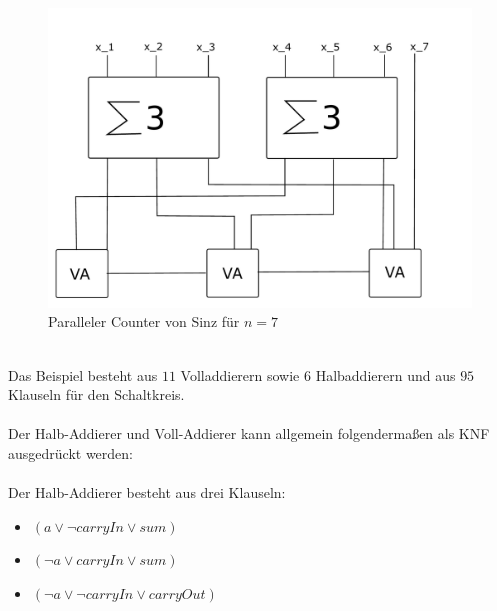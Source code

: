 \documentclass[a4,abstract=on]{scrartcl}
\begin{document}
\begin{figure}[H]
\centering
\includegraphics[width=\textwidth]{bsp_Sinz_fein.pdf}
\caption{Paralleler Counter von Sinz für $n=7$}
\label{fig:sinz_counter_para_bsp}
\end{figure}
\ \\
Das Beispiel besteht aus $11$ Volladdierern sowie 6 Halbaddierern und aus $95$ Klauseln für den Schaltkreis.\\
\ \\
Der Halb-Addierer und Voll-Addierer kann allgemein folgendermaßen als KNF ausgedrückt werden:\\
\ \\
Der Halb-Addierer besteht aus drei Klauseln:
\begin{itemize}
\item[] $(a \vee \neg carryIn \vee sum)$
\item[] $(\neg a \vee carryIn \vee sum)$
\item[] $(\neg a \vee \neg carryIn \vee carryOut )$
\end{itemize}
\end{document}
